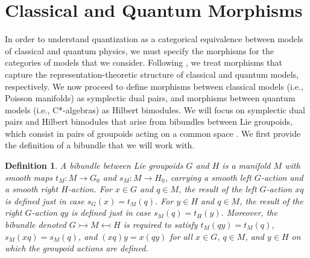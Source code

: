 \documentclass[sn-mathphys,Numbered]{sn-jnl}
\newtheorem{definition}{Definition}%
\begin{document}
\section{Classical and Quantum Morphisms}
\label{sec:arrows}

In order to understand quantization as a categorical equivalence between models of classical and quantum physics, we must specify the morphisms for the categories of models that we consider.  Following \citet{La01a,La01c}, we treat morphisms that capture the representation-theoretic structure of classical and quantum models, respectively. 
 We now proceed to define morphisms between classical models (i.e., Poisson manifolds) as symplectic dual pairs, and morphisms between quantum models (i.e., C*-algebras) as Hilbert bimodules.  We will focus on symplectic dual pairs and Hilbert bimodules that arise from bibundles between Lie groupoids, which consist in pairs of groupoids acting on a common space \citep{Ma87,Mo88,MuReWi87}.  We first provide the definition of a bibundle that we will work with.\bigskip

 \begin{definition}
     A \emph{bibundle} between Lie groupoids $G$ and $H$ is a manifold $M$ with smooth maps $t_M: M\to G_0$ and $s_M: M\to H_0$, carrying a smooth left $G$-action and a smooth right $H$-action.  For $x\in G$ and $q\in M$, the result of the left $G$-action $xq$ is defined just in case $s_G(x) = t_M(q)$.  For $y\in H$ and $q\in M$, the result of the right $G$-action $qy$ is defined just in case $s_M(q) = t_H(y)$.  Moreover, the bibundle denoted $G\rightarrowtail M\leftarrowtail H$ is required to satisfy $t_M(qy) = t_M(q)$, $s_M(xq) = s_M(q)$, and $(xq)y = x(qy)$ for all $x\in G$, $q\in M$, and $y\in H$ on which the groupoid actions are defined.
 \end{definition}\bigskip
\end{document}
